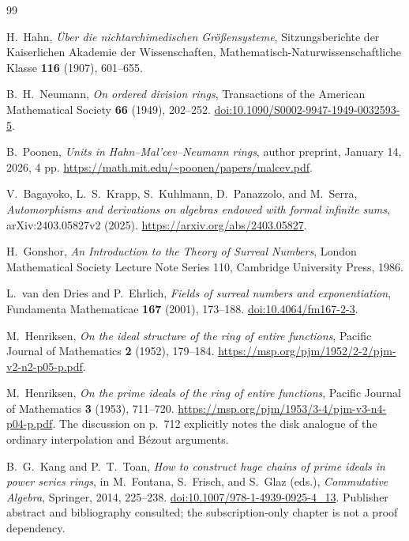 \documentclass[11pt,letterpaper]{article}
\numberwithin{equation}{section}
\theoremstyle{definition}
\theoremstyle{remark}
\begin{document}
\begin{thebibliography}{99}

H.~Hahn, \emph{\"Uber die nichtarchimedischen Gr\"o\ss ensysteme},
Sitzungsberichte der Kaiserlichen Akademie der Wissenschaften,
Mathematisch-Naturwissenschaftliche Klasse \textbf{116} (1907),
601--655.

B.~H.~Neumann, \emph{On ordered division rings},
Transactions of the American Mathematical Society \textbf{66} (1949),
202--252. \href{https://doi.org/10.1090/S0002-9947-1949-0032593-5}{doi:10.1090/S0002-9947-1949-0032593-5}.

B.~Poonen, \emph{Units in Hahn--Mal'cev--Neumann rings},
author preprint, January 14, 2026, 4 pp.
\url{https://math.mit.edu/~poonen/papers/malcev.pdf}.

V.~Bagayoko, L.~S.~Krapp, S.~Kuhlmann, D.~Panazzolo, and M.~Serra,
\emph{Automorphisms and derivations on algebras endowed with formal
infinite sums}, arXiv:2403.05827v2 (2025).
\url{https://arxiv.org/abs/2403.05827}.

H.~Gonshor, \emph{An Introduction to the Theory of Surreal Numbers},
London Mathematical Society Lecture Note Series 110,
Cambridge University Press, 1986.

L.~van den Dries and P.~Ehrlich, \emph{Fields of surreal numbers and
exponentiation}, Fundamenta Mathematicae \textbf{167} (2001), 173--188.
\href{https://doi.org/10.4064/fm167-2-3}{doi:10.4064/fm167-2-3}.

M.~Henriksen, \emph{On the ideal structure of the ring of entire
functions}, Pacific Journal of Mathematics \textbf{2} (1952), 179--184.
\url{https://msp.org/pjm/1952/2-2/pjm-v2-n2-p05-p.pdf}.

M.~Henriksen, \emph{On the prime ideals of the ring of entire functions},
Pacific Journal of Mathematics \textbf{3} (1953), 711--720.
\url{https://msp.org/pjm/1953/3-4/pjm-v3-n4-p04-p.pdf}.
The discussion on p.~712 explicitly notes the disk analogue of the
ordinary interpolation and B\'ezout arguments.

B.~G.~Kang and P.~T.~Toan, \emph{How to construct huge chains of prime
ideals in power series rings}, in M.~Fontana, S.~Frisch, and S.~Glaz
(eds.), \emph{Commutative Algebra}, Springer, 2014, 225--238.
\href{https://doi.org/10.1007/978-1-4939-0925-4_13}{doi:10.1007/978-1-4939-0925-4\_13}.
Publisher abstract and bibliography consulted; the subscription-only
chapter is not a proof dependency.


\end{thebibliography}
\end{document}
